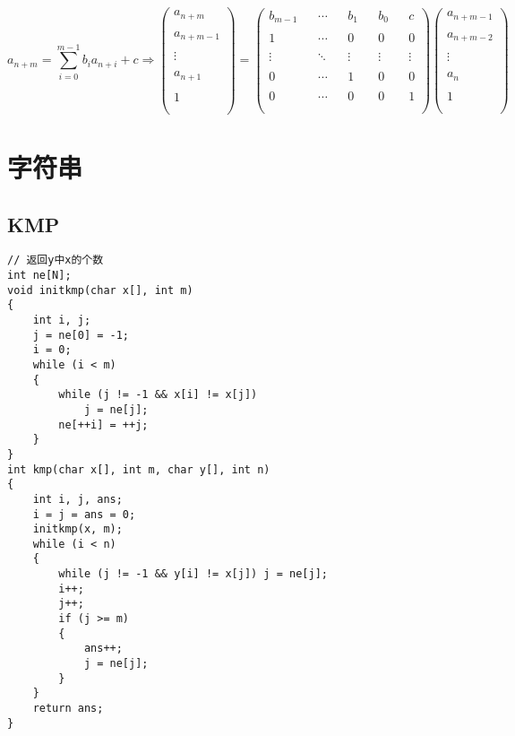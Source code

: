 \documentclass[a4]{article}
\begin{document}
\begin{enumerate}
$$
a_{n+m}=\sum_{i=0}^{m-1}b_ia_{n+i}+c\Rightarrow
\left(
\begin{matrix}
 a_{n+m}    \\\\
 a_{n+m-1}  \\\\
 \vdots     \\\\
 a_{n+1}    \\\\
 1          \\\\
\end{matrix}
\right)
=
\left(
\begin{matrix}
 b_{m-1} && \cdots && b_1    && b_0    && c      \\\\
 1       && \cdots && 0      && 0      && 0      \\\\
 \vdots  && \ddots && \vdots && \vdots && \vdots \\\\
 0       && \cdots && 1      && 0      && 0      \\\\
 0       && \cdots && 0      && 0      && 1      \\\\
\end{matrix}
\right)
\left(
\begin{matrix}
 a_{n+m-1} \\\\
 a_{n+m-2} \\\\
 \vdots    \\\\
 a_n       \\\\
 1         \\\\
\end{matrix}
\right)
$$
\end{enumerate}
\clearpage\section{字符串}
\subsection{KMP}
\begin{lstlisting}
// 返回y中x的个数
int ne[N];
void initkmp(char x[], int m)
{
    int i, j;
    j = ne[0] = -1;
    i = 0;
    while (i < m)
    {
        while (j != -1 && x[i] != x[j])
            j = ne[j];
        ne[++i] = ++j;
    }
}
int kmp(char x[], int m, char y[], int n)
{
    int i, j, ans;
    i = j = ans = 0;
    initkmp(x, m);
    while (i < n)
    {
        while (j != -1 && y[i] != x[j]) j = ne[j];
        i++;
        j++;
        if (j >= m)
        {
            ans++;
            j = ne[j];
        }
    }
    return ans;
}
\end{lstlisting}
\end{document}
